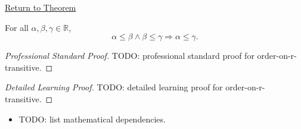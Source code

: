 \newpage
{}
\label{prf:order-on-r-transitive}

\begin{remark*}[Return]
\hyperref[thm:order-on-r-transitive]{Return to Theorem}
\end{remark*}

\begin{theorem*}
For all $\alpha,\beta,\gamma\in\mathbb{R}$,
\[
\alpha\le\beta\land\beta\le\gamma \Longrightarrow \alpha\le\gamma.
\]
\end{theorem*}

\begin{proof}[Professional Standard Proof]
\LRAProofBodyStart
TODO: professional standard proof for order-on-r-transitive.
\end{proof}

\begin{proof}[Detailed Learning Proof]
\LRAProofBodyStart
TODO: detailed learning proof for order-on-r-transitive.
\end{proof}

\begin{remark*}
\end{remark*}

\begin{dependencies}
\begin{itemize}
  \item TODO: list mathematical dependencies.
\end{itemize}
\end{dependencies}

\clearpage
